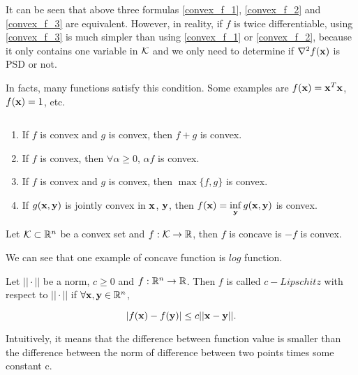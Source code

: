 \documentclass[../main.tex]{subfiles}
\begin{document}
\begin{remark}
	 It can be seen that above three formulas \eqref{convex_f_1}, \eqref{convex_f_2} and \eqref{convex_f_3} are equivalent. However, in reality, if $f$ is twice differentiable, using \eqref{convex_f_3} is much simpler than using \eqref{convex_f_1} or \eqref{convex_f_2}, because it only contains one variable in $\mathcal{K}$ and we only need to determine if $\nabla^2f(\mathbf{x})$ is PSD or not.
	 
	   In facts, many functions satisfy this condition. Some examples are $f(\mathbf{x}) = \mathbf{x}^T \mathbf{x}$, $f(\mathbf{x}) = 1$, etc.
\end{remark}


\begin{proposition} $\quad$ 
	\begin{enumerate}
		\item If $f$ is convex and $g$ is convex, then $f + g$ is convex.
		\item If $f$ is convex, then $\forall \alpha \geq 0 $, $\alpha f$ is convex.
		\item If $f$ is convex and $g$ is convex, then $\max\{f,g\}$ is convex.
		\item If $g(\mathbf{x}, \mathbf{y})$ is jointly convex in $\mathbf{x}$, $\mathbf{y}$, then $f(\mathbf{x}) = \inf\limits_{\mathbf{y}} g(\mathbf{x}, \mathbf{y})$ is convex.
	\end{enumerate}
\end{proposition}

\begin{definition}
	Let $\mathcal{K} \subset  \mathbb{R}^n $ be a convex set and $f:\mathcal{K} \to \mathbb{R}$, then $f$ is concave is $-f$ is convex.
\end{definition}

We can see that one example of concave function is $log$ function.


\begin{definition}[Lipschitz]
	Let $||\cdot||$ be a norm, $c \geq 0$ and $f:\mathbb{R}^n \to \mathbb{R}$. Then $f$ is called $c-Lipschitz$ with respect to $||\cdot||$ if $\forall \mathbf{x}, \mathbf{y} \in \mathbb{R}^n$, 
	
	\begin{equation}
		|f(\mathbf{x}) - f(\mathbf{y})| \leq c||\mathbf{x} - \mathbf{y}||.
	\end{equation}
	
	Intuitively, it means that the difference between function value is smaller than the difference between the norm of difference between two points times some constant c.
\end{definition}
\end{document}
